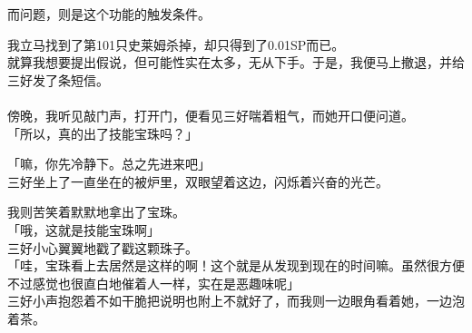 而问题，则是这个功能的触发条件。

我立马找到了第101只史莱姆杀掉，却只得到了0.01SP而已。\\

就算我想要提出假说，但可能性实在太多，无从下手。于是，我便马上撤退，并给三好发了条短信。\\

\sqsplit\\

傍晚，我听见敲门声，打开门，便看见三好喘着粗气，而她开口便问道。\\

「所以，真的出了技能宝珠吗？」

「嘛，你先冷静下。总之先进来吧」\\

三好坐上了一直坐在的被炉里，双眼望着这边，闪烁着兴奋的光芒。

我则苦笑着默默地拿出了宝珠。\\

「哦，这就是技能宝珠啊」\\

三好小心翼翼地戳了戳这颗珠子。\\

「哇，宝珠看上去居然是这样的啊！这个就是从发现到现在的时间嘛。虽然很方便不过感觉也很直白地催着人一样，实在是恶趣味呢」\\

三好小声抱怨着不如干脆把说明也附上不就好了，而我则一边眼角看着她，一边泡着茶。\\

